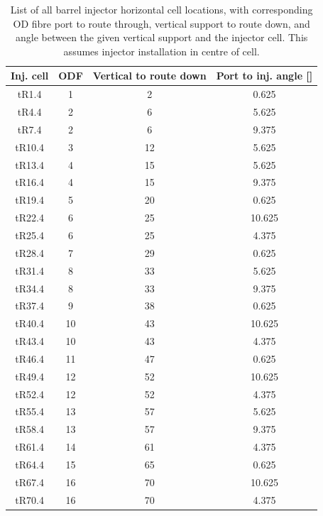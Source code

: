 \documentclass[a4paper,11pt]{article}
\begin{document}
\begin{table}
\centering
\begin{tabular}{cccc}\toprule
Inj. cell	&	ODF	&	Vertical to route down	&	Port to inj. angle	[\degree ]	\\ \midrule
tR1.4		&	1	&		2					&		\phantom{0}0.625		\\
tR4.4		&	2	&		6					&		\phantom{0}5.625		\\
tR7.4		&	2	&		6					&		\phantom{0}9.375		\\
tR10.4		&	3	&		12					&		\phantom{0}5.625		\\
tR13.4		&	4	&		15					&		\phantom{0}5.625		\\
tR16.4		&	4	&		15					&		\phantom{0}9.375		\\
tR19.4		&	5	&		20					&		\phantom{0}0.625		\\
tR22.4		&	6	&		25					&		10.625		\\
tR25.4		&	6	&		25					&		\phantom{0}4.375		\\
tR28.4		&	7	&		29					&		\phantom{0}0.625		\\
tR31.4		&	8	&		33					&		\phantom{0}5.625		\\
tR34.4		&	8	&		33					&		\phantom{0}9.375		\\
tR37.4		&	9	&		38					&		\phantom{0}0.625		\\
tR40.4		&	10	&		43					&		10.625		\\
tR43.4		&	10	&		43					&		\phantom{0}4.375		\\
tR46.4		&	11	&		47					&		\phantom{0}0.625		\\
tR49.4		&	12	&		52					&		10.625		\\
tR52.4		&	12	&		52					&		\phantom{0}4.375		\\
tR55.4		&	13	&		57					&		\phantom{0}5.625		\\
tR58.4		&	13	&		57					&		\phantom{0}9.375		\\
tR61.4		&	14	&		61					&		\phantom{0}4.375		\\
tR64.4		&	15	&		65					&		\phantom{0}0.625		\\
tR67.4		&	16	&		70					&		10.625		\\
tR70.4		&	16	&		70					&		\phantom{0}4.375		\\ \bottomrule
\end{tabular}
\caption{List of all barrel injector horizontal cell locations, with corresponding OD fibre port to route through, vertical support to route down, and angle between the given vertical support and the injector cell. This assumes injector installation in centre of cell.}\label{tab:barrelInjPorts}
\end{table}
\end{document}
